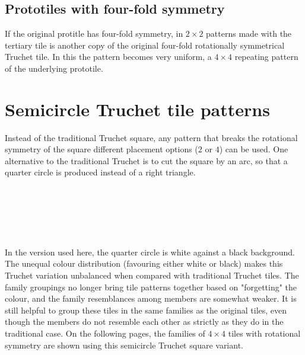 \documentclass{tufte-book}
\begin{document}
\section{Prototiles with four-fold symmetry}

\noindent
If the original protitle has four-fold symmetry, in $2\times 2$ patterns made with the tertiary tile is another copy of the original four-fold rotationally symmetrical Truchet tile. In this the pattern becomes very uniform, a $4\times4$ repeating pattern of the underlying prototile.

{
\setlength{\tabcolsep}{0pt}
\renewcommand{\arraystretch}{0}

}
\chapter{Semicircle Truchet tile patterns}

\noindent
Instead of the traditional Truchet square, any pattern that breaks the rotational symmetry of the square different placement options ($2$ or $4$) can be used. One alternative to the traditional Truchet is to cut the square by an arc, so that a quarter circle is produced instead of a right triangle. 

\,
\vspace{0.2cm}

{
\setlength{\tabcolsep}{3pt}
\renewcommand{\arraystretch}{2}

}

\,
\vspace{0.2cm}
{
\setlength{\tabcolsep}{0pt}
\renewcommand{\arraystretch}{0}

}

\,
\vspace{0.2cm}

\noindent
In the version used here, the quarter circle is  white against a black background. The unequal colour distribution (favouring either white or black) makes this Truchet variation unbalanced when compared with traditional Truchet tiles. The family groupings no longer bring tile patterns together based on "forgetting" the colour, and the family resemblances among members are somewhat weaker. It is still helpful to group these tiles in the same families as the original tiles, even though the members do not resemble each other as strictly as they do in the traditional case. On the following pages, the families of $4\times4$  tiles with rotational symmetry are shown using this semicircle Truchet square variant.

\newpage
\end{document}

